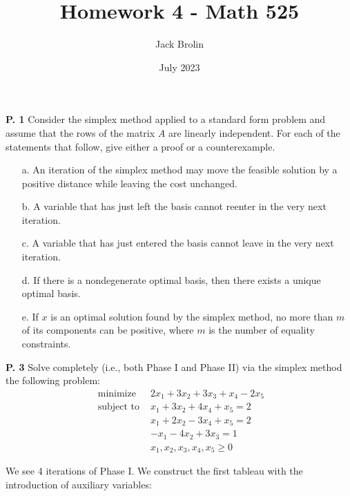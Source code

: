 \documentclass{article}
\title{Homework 4 - Math 525}
\author{Jack Brolin}
\date{July 2023}
\begin{document}
\maketitle

\begin{jacklist}
    \begin{framed} 
    \item [\textbf{P. 1}] Consider the simplex method applied to a standard form problem and assume that the rows of the matrix 
        $A$ are linearly independent. For each of the statements that follow, give either a proof or a counterexample.
        \begin{itemize}
            \item [a.] An iteration of the simplex method may move the feasible solution by a positive distance while leaving 
                the cost unchanged.
            \item [b.] A variable that has just left the basis cannot reenter in the very next iteration.
            \item [c.] A variable that has just entered the basis cannot leave in the very next iteration.
            \item [d.] If there is a nondegenerate optimal basis, then there exists a unique optimal basis.
            \item [e.] If $x$ is an optimal solution found by the simplex method, no more than $m$ of its components can be positive, 
                where $m$ is the number of equality constraints.
        \end{itemize}
    \end{framed}
\newpage
    \begin{framed} 
    \item [\textbf{P. 3}] Solve completely (i.e., both Phase I and Phase II) via the simplex method the following problem: 
    \[ 
        \begin{array}{rc}
        \text { minimize } & 2 x_{1}+3 x_{2}+3 x_{3}+x_{4}-2 x_{5} \\
        \text { subject to } & x_{1}+3 x_{2}+4 x_{4}+x_{5}=2 \\
        & x_{1}+2 x_{2}-3 x_{4}+x_{5}=2 \\
        & -x_{1}-4 x_{2}+3 x_{3}=1 \\
        & x_{1}, x_{2}, x_{3}, x_{4}, x_{5} \geq 0
        \end{array}
    \] 
    \end{framed}
    We see 4 iterations of Phase I. We construct the first tableau with the introduction of auxiliary variables: 

\end{jacklist}
\end{document}
